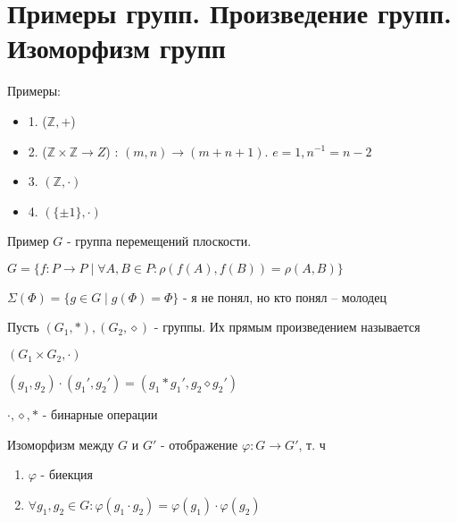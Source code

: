 
\section{Примеры групп. Произведение групп. Изоморфизм групп}
Примеры:
\begin{itemize}
\item[] 1. ($\mathbb{Z}, +$)
\item[] 2. ($\mathbb{Z}\times \mathbb{Z} \to Z$) : $(m, n) \to (m+n+1)$. $e=1, n^{-1}=n-2$
\item[] 3. $(\mathbb{Z}, \cdot)$
\item[] 4. $(\{\pm 1\}, \cdot)$
\end{itemize}

Пример $G$ - группа перемещений плоскости.

$G = \{f: P \to P \mid \forall A, B \in P : \rho (f(A), f(B)) = \rho(A, B)\}$

$\Sigma(\Phi) = \{g \in G \mid g(\Phi) = \Phi\}$ - я не понял, но кто понял -- молодец

\begin{conj}
    Пусть $(G_1, *), (G_2, \diamond)$ - группы. Их прямым произведением называется
    
    $(G_1\times G_2, \cdot)$
    
    $(g_1, g_2) \cdot (g_1', g_2') = (g_1*g_1', g_2\diamond g_2')$
    
$\cdot, \diamond, *$ - бинарные операции
\end{conj}
\begin{conj}
    Изоморфизм между $G$ и $G'$ - отображение $\varphi : G \to G'$, т. ч
    \begin{enumerate}
        \item $\varphi$ - биекция
        \item $\forall g_1, g_2 \in G : \varphi (g_1\cdot  g_2) = \varphi (g_1)\cdot \varphi(g_2)$
    \end{enumerate}
\end{conj}